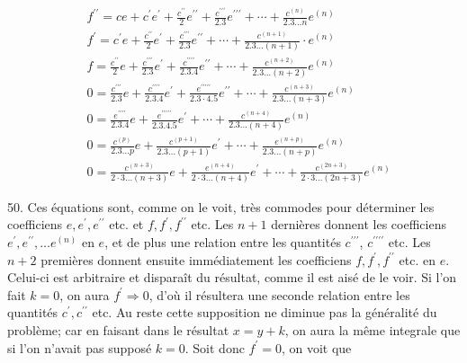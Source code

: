 \documentclass{article}
\begin{document}
\[
\begin{aligned}
& f^{\prime \prime}=c e+c^{\prime} e^{\prime}+\frac{c^{\prime \prime}}{2} e^{\prime \prime}+\frac{c^{\prime \prime \prime}}{2.3} e^{\prime \prime \prime}+\cdots+\frac{c^{(n)}}{2.3 \ldots n} e^{(n)} \\
& f^{\prime}=c^{\prime} e+\frac{c^{\prime \prime}}{2} e^{\prime}+\frac{c^{\prime \prime \prime}}{2.3} e^{\prime \prime}+\cdots+\frac{c^{(n+1)}}{2.3 \ldots(n+1)} \cdot e^{(n)} \\
& f=\frac{c^{\prime \prime}}{2} e+\frac{c^{\prime \prime \prime}}{2.3} e^{\prime}+\frac{c^{\prime \prime \prime \prime}}{2.3 .4} e^{\prime \prime}+\cdots+\frac{c^{(n+2)}}{2.3 \ldots(n+2)} e^{(n)} \\
& 0=\frac{c^{\prime \prime \prime}}{2.3} e+\frac{c^{\prime \prime \prime \prime}}{2.3 .4} e^{\prime}+\frac{e^{\prime \prime \prime \prime \prime}}{2.3 \cdot 4.5} e^{\prime \prime}+\cdots+\frac{c^{(n+3)}}{2.3 \ldots(n+3)} e^{(n)} \\
& 0=\frac{e^{\prime \prime \prime \prime}}{2.3 .4} e+\frac{e^{\prime \prime \prime \prime \prime}}{2.3 .4 .5} e^{\prime}+\cdots+\frac{c^{(n+4)}}{2.3 \ldots(n+4)} e^{(n)} \\
& 0=\frac{c^{(p)}}{2.3 \ldots p} e+\frac{c^{(p+1)}}{2.3 \ldots(p+1)} e^{\prime}+\cdots+\frac{e^{(n+p)}}{2.3 \ldots(n+p)} e^{(n)} \\
& 0=\frac{c^{(n+3)}}{2 \cdot 3 \ldots(n+3)} e+\frac{e^{(n+4)}}{2 \cdot 3 \ldots(n+4)} e^{\prime}+\cdots+\frac{c^{(2 n+3)}}{2 \cdot 3 \ldots(2 n+3)} e^{(n)}
\end{aligned}
\]

50. Ces équations sont, comme on le voit, très commodes pour déterminer les coefficiens \(e, e^{\prime}, e^{\prime \prime}\) etc. et \(f, f^{\prime}, f^{\prime \prime}\) etc. Les \(n+1\) dernières donnent les coefficiens \(e^{\prime}, e^{\prime \prime}, \ldots e^{(n)}\) en \(e\), et de plus une relation entre les quantités \(c^{\prime \prime \prime}\), \(c^{\prime \prime \prime \prime}\) etc. Les \(n+2\) premières donnent ensuite immédiatement les coefficiens \(f, f^{\prime}, f^{\prime \prime}\) etc. en \(e\). Celui-ci est arbitraire et disparaît du résultat, comme il est aisé de le voir. Si l'on fait \(k=0\), on aura \(f^{\prime} \Rightarrow 0\), d'où il résultera une seconde relation entre les quantités \(c^{\prime}, c^{\prime \prime}\) etc. Au reste cette supposition ne diminue pas la généralité du problème; car en faisant dans le résultat \(x=y+k\), on aura la même integrale que si l'on n'avait pas supposé \(k=0\). Soit donc \(f^{\prime}=0\), on voit que
\end{document}

